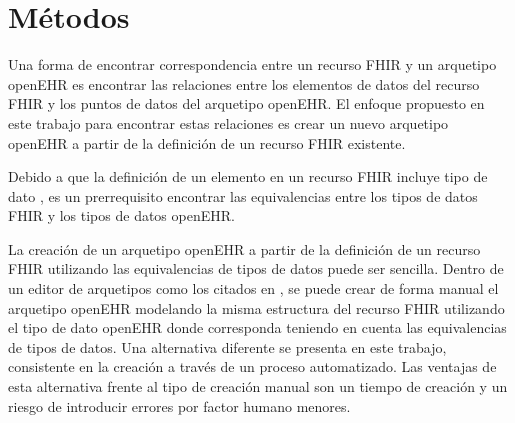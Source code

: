 \section{Métodos}

 Una forma de encontrar correspondencia entre un recurso FHIR y un arquetipo openEHR es encontrar las relaciones entre los elementos de datos del recurso FHIR y los puntos de datos del arquetipo openEHR. El enfoque propuesto en este trabajo para encontrar estas relaciones es crear un nuevo arquetipo openEHR a partir de la definición de un recurso FHIR existente.

Debido a que la definición de un elemento en un recurso FHIR incluye tipo de dato \cite{FHIRElement}, es un prerrequisito encontrar las equivalencias entre los tipos de datos FHIR y los tipos de datos openEHR.

La creación de un arquetipo openEHR a partir de la definición de un recurso FHIR utilizando las equivalencias de tipos de datos puede ser sencilla. Dentro de un editor de arquetipos como los citados en \cite{openEHRModellingTools}, se puede crear de forma manual el arquetipo openEHR modelando la misma estructura del recurso FHIR utilizando el tipo de dato openEHR donde corresponda teniendo en cuenta las equivalencias de tipos de datos. Una alternativa diferente se presenta en este trabajo, consistente en la creación a través de un proceso automatizado. Las ventajas de esta alternativa frente al tipo de creación manual son un tiempo de creación y un riesgo de introducir errores por factor humano menores.




